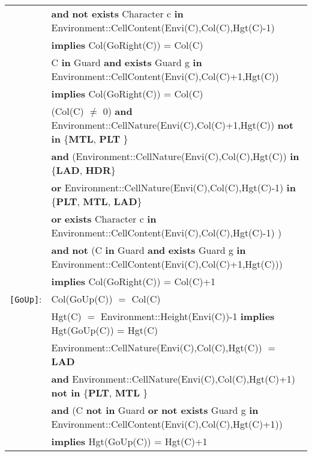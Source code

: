 \documentclass[8pt]{article}
\begin{document}
{\begin{longtable}{rl}
  & \quad\quad \textbf{and} \textbf{not exists} \textrm{Character} c \textbf{in} \textrm{Environment::CellContent(Envi(C),Col(C),Hgt(C)-1)} \\
  & \quad\quad \textbf{implies} \textrm{Col(GoRight(C))} = \textrm{Col(C)} \\
  & \textrm{C} \textbf{in} \textrm{Guard} \textbf{and} \textbf{exists} \textrm{Guard} g \textbf{in} \textrm{Environment::CellContent(Envi(C),Col(C)+1,Hgt(C))} \\ & \quad\quad \textbf{implies} \textrm{Col(GoRight(C))} = \textrm{Col(C)} \\
  & (\textrm{Col(C)} $\neq$ 0) \textbf{and} \textrm{Environment::CellNature(Envi(C),Col(C)+1,Hgt(C))} \textbf{not in} \{\textbf{MTL}, \textbf{PLT} \} \\
  & \quad\quad \textbf{and} (\textrm{Environment::CellNature(Envi(C),Col(C),Hgt(C))} \textbf{in} \{\textbf{LAD}, \textbf{HDR}\} \\
  & \quad\quad\quad\quad \textbf{or} \textrm{Environment::CellNature(Envi(C),Col(C),Hgt(C)-1)} \textbf{in} \{\textbf{PLT}, \textbf{MTL}, \textbf{LAD}\} \\
  & \quad\quad\quad\quad \textbf{or} \textbf{exists} \textrm{Character} c \textbf{in} \textrm{Environment::CellContent(Envi(C),Col(C),Hgt(C)-1)} ) \\
  & \quad\quad \textbf{and} \textbf{not} (\textrm{C} \textbf{in} \textrm{Guard} \textbf{and} \textbf{exists} \textrm{Guard} g \textbf{in} \textrm{Environment::CellContent(Envi(C),Col(C)+1,Hgt(C))}) \\
  & \quad\quad \textbf{implies} \textrm{Col(GoRight(C))} = \textrm{Col(C)}+1 \\
\texttt{[GoUp]}: & \textrm{Col(GoUp(C))} $=$ \textrm{Col(C)} \\
  & \textrm{Hgt(C)} $=$ \textrm{Environment::Height(Envi(C))-1} \textbf{implies} \textrm{Hgt(GoUp(C))} = \textrm{Hgt(C)} \\
  & \textrm{Environment::CellNature(Envi(C),Col(C),Hgt(C))} $=$ \textbf{LAD} \\
  & \quad\quad \textbf{and} \textrm{Environment::CellNature(Envi(C),Col(C),Hgt(C)+1)} \textbf{not in} \{\textbf{PLT}, \textbf{MTL} \} \\
  & \quad\quad \textbf{and} (\textrm{C} \textbf{not in} \textrm{Guard} \textbf{or} \textbf{not exists} \textrm{Guard} g \textbf{in} \textrm{Environment::CellContent(Envi(C),Col(C),Hgt(C)+1)}) \\
  & \quad\quad \textbf{implies} \textrm{Hgt(GoUp(C))} = \textrm{Hgt(C)}+1 \\

\end{longtable}}
\end{document}
